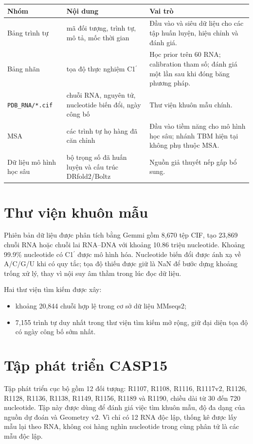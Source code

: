 \documentclass[12pt,a4paper,oneside]{report}
\newcommand{\cprime}{C1$^{\prime}$}
\begin{document}
\begin{longtable}{p{}p{}p{}}
\toprule
Nhóm & Nội dung & Vai trò\\
\midrule
\endhead
Bảng trình tự & mã đối tượng, trình tự, mô tả, mốc thời gian & Đầu vào và siêu dữ liệu cho các tập huấn luyện, hiệu chỉnh và đánh giá.\\
Bảng nhãn & tọa độ thực nghiệm \cprime{} & Học prior trên 60 RNA; calibration tham số; đánh giá một lần sau khi đóng băng phương pháp.\\
\texttt{PDB\_RNA/*.cif} & chuỗi RNA, nguyên tử, nucleotide biến đổi, ngày công bố & Thư viện khuôn mẫu chính.\\
MSA & các trình tự họ hàng đã căn chỉnh & Đầu vào tiềm năng cho mô hình học sâu; nhánh TBM hiện tại không phụ thuộc MSA.\\
Dữ liệu mô hình học sâu & bộ trọng số đã huấn luyện và cấu trúc DRfold2/Boltz & Nguồn giả thuyết nếp gấp bổ sung.\\
\bottomrule
\end{longtable}

\section{Thư viện khuôn mẫu}

Phiên bản dữ liệu được phân tích bằng Gemmi gồm 8,670 tệp CIF, tạo 23,869 chuỗi RNA
hoặc chuỗi lai RNA--DNA với khoảng 10.86 triệu nucleotide. Khoảng 99.9\% nucleotide có
\cprime{} được mô hình hóa. Nucleotide biến đổi được ánh xạ về A/C/G/U khi có quy tắc;
tọa độ thiếu được giữ là NaN để bước dựng khoảng trống xử lý, thay vì nội suy âm thầm
trong lúc đọc dữ liệu.

Hai thư viện tìm kiếm được xây:

\begin{itemize}
  \item khoảng 20,844 chuỗi hợp lệ trong cơ sở dữ liệu MMseqs2;
  \item 7,155 trình tự duy nhất trong thư viện tìm kiếm mở rộng, giữ đại diện tọa độ
  có ngày công bố sớm nhất.
\end{itemize}

\section{Tập phát triển CASP15}

Tập phát triển cục bộ gồm 12 đối tượng: R1107, R1108, R1116, R1117v2, R1126, R1128,
R1136, R1138, R1149, R1156, R1189 và R1190, chiều dài từ 30 đến 720 nucleotide. Tập
này được dùng để đánh giá việc tìm khuôn mẫu, độ đa dạng của nguồn dự đoán và Geometry
v2. Vì chỉ có 12 RNA độc lập, thống kê được lấy mẫu lại theo RNA, không coi hàng nghìn
nucleotide trong cùng phân tử là các mẫu độc lập.
\end{document}
